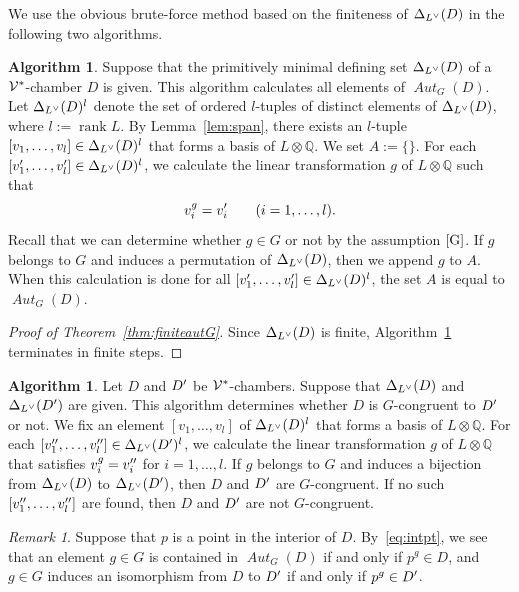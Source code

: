 \documentclass{amsart}
\theoremstyle{plain}
\theoremstyle{definition}
\newtheorem{algorithm}[theorem]{Algorithm}
\theoremstyle{remark}
\newtheorem{remark}[theorem]{Remark}
\numberwithin{equation}{section}
\numberwithin{table}{section}
\numberwithin{figure}{section}
\newcommand{\Q}{\mathord{\mathbb  Q}}
\newcommand{\VVV}{\mathord{\mathcal V}}
\newcommand{\tensor}{\otimes}
\newcommand{\sprime}{\sp\prime}
\newcommand{\spprime}{\sp{\prime\prime}}
\newcommand{\dual}{\sp{\vee}}
\newcommand{\rank}{\operatorname{\mathrm {rank}}\nolimits}
\newcommand{\aut}{\operatorname{\mathit {Aut}}\nolimits}
\newcommand{\autG}{\aut_G}
\newcommand{\sphyp}{\sp*}
\newcommand{\propVG}{\mathord{\rm [G]}}
\begin{document}
 We use the obvious brute-force method based on the finiteness of $\Delta_{L\dual}(D)$ in the following two algorithms.
 \begin{algorithm}\label{algorithm:autG}
 Suppose that the primitively minimal defining set 
 $\Delta_{L\dual}(D)$ of a $\VVV\sphyp$-chamber $D$ is given.
 This algorithm calculates all elements of $\autG(D)$.
Let $\Delta_{L\dual}(D)^l$ denote 
the set of ordered $l$-tuples of distinct elements of $\Delta_{L\dual}(D)$,
 where $l:=\rank  L$.
 By Lemma~\ref{lem:span},
 there exists an $l$-tuple $[v_1, \dots, v_l]\in \Delta_{L\dual}(D)^l$
 that forms a basis of $L\tensor \Q$.
 We set $A:=\{\}$.
 For each $[v_1\sprime, \dots, v_l\sprime]\in \Delta_{L\dual}(D)^l$,
 we calculate the linear transformation $g$ of $L\tensor \Q$ such that
 $$
 v_i^g=v_i\sprime \qquad (i=1, \dots, l).
 $$
 Recall that we can determine whether $g\in G$ or not by the assumption $\propVG$.
 If $g$ belongs to $G$ and induces a permutation of $\Delta_{L\dual}(D)$, then we append $g$ to $A$.
 When this calculation is done for all $[v_1\sprime, \dots, v_l\sprime]\in \Delta_{L\dual}(D)^l$,
 the set $A$ is equal to $\autG(D)$.
 \end{algorithm}
 \begin{proof}[Proof of Theorem~\ref{thm:finiteautG}]
Since $\Delta_{L\dual}(D)$ is finite, 
Algorithm~\ref{algorithm:autG} terminates in  finite steps.
\end{proof}
 \begin{algorithm}\label{algorithm:Gequiv}
 Let $D$ and $D\sprime$ be  $\VVV\sphyp$-chambers.
 Suppose that $\Delta_{L\dual}(D)$ and $\Delta_{L\dual}(D\sprime)$ are given.
 This algorithm determines whether $D$ is $G$-congruent to  $D\sprime$ or not.
We fix  an element $[v_1, \dots, v_l]$  of $\Delta_{L\dual}(D)^l$
 that forms a basis of $L\tensor \Q$.
 For each $[v_1\spprime, \dots, v_l\spprime]\in \Delta_{L\dual}(D\sprime)^l$,
 we calculate the linear transformation $g$ of $L\tensor \Q$ that satisfies 
 $ v_i^g=v_i\spprime$  for $i=1, \dots, l$.
 If $g$ belongs to $G$ and 
induces a bijection from  $\Delta_{L\dual}(D)$ to $\Delta_{L\dual}(D\sprime)$,
 then $D$ and $D\sprime$ are $G$-congruent.
 If no such $[v_1\spprime, \dots, v_l\spprime]$ are found, then $D$ and $D\sprime$ are not $G$-congruent.
 \end{algorithm}
%
\begin{remark}\label{rem:intpt}
Suppose that  $p$ is a point  in the interior of $D$.
By~\eqref{eq:intpt}, we see that
an element  $g\in G$ is contained in $\autG(D)$  if and only if
$p^g\in D$, 
and $g\in G$ induces an isomorphism from $D$ to $D\sprime$ if and only if $p^g\in D\sprime$. 
\end{remark}
%
%
\end{document}
